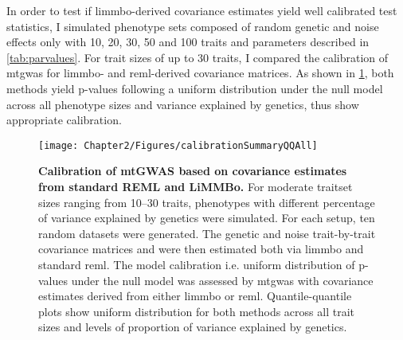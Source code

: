 In order to test if \gls{limmbo}-derived covariance estimates yield well calibrated test statistics, I simulated phenotype sets composed of random genetic and noise effects only with \num{10}, \num{20}, \num{30}, \num{50} and \num{100} traits and parameters described in \cref{tab:parvalues}. For trait sizes of up to \num{30} traits, I compared the calibration of \gls{mtgwas} for \gls{limmbo}- and \gls{reml}-derived covariance matrices. As shown in \cref{fig:calibration}, both methods yield p-values following a uniform distribution under the null model across all phenotype sizes and variance explained by genetics, thus show appropriate calibration. 
%
\begin{figure}[h!]
	\centering	
	\texttt{[image: Chapter2/Figures/calibrationSummaryQQAll]}\\
	\caption[\textbf{Calibration of mtGWAS based on covariance estimates from standard REML and LiMMBo.}]{\textbf{Calibration of mtGWAS based on covariance estimates from standard REML and LiMMBo.} For moderate traitset sizes ranging from \numrange{10}{30} traits, phenotypes with different percentage of variance explained by genetics were simulated. For each setup, ten random datasets were generated. The genetic and noise trait-by-trait covariance matrices  and  were then estimated both via \gls{limmbo} and standard \gls{reml}. The model calibration i.e. uniform distribution of p-values under the null model was assessed by \gls{mtgwas} with covariance estimates derived from either \gls{limmbo} or \gls{reml}. Quantile-quantile plots show uniform distribution for both methods across all trait sizes and levels of proportion of variance explained by genetics.}
	  \label{fig:calibration}%
	  \vspace{-2mm}
\end{figure}
%

